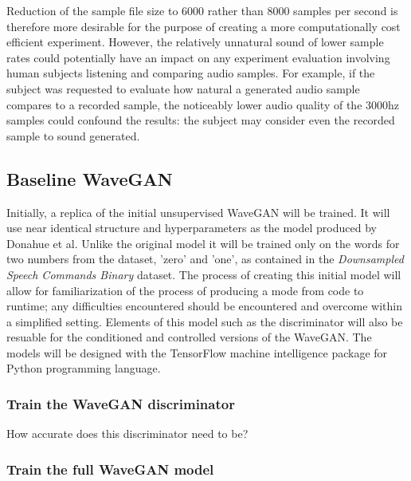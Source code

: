 \documentclass[titlepage]{article}
\begin{document}
\newline
\newline
Reduction of the sample file size to 6000 rather than 8000 samples per second is therefore more desirable for the purpose of creating a more computationally cost efficient experiment.
However, the relatively unnatural sound of lower sample rates could potentially have an impact on any experiment evaluation involving human subjects listening and comparing audio samples.
For example, if the subject was requested to evaluate how natural a generated audio sample compares to a recorded sample, the noticeably lower audio quality of the 3000hz samples could confound the results: the subject may consider even the recorded sample to sound generated.

\subsection{Baseline WaveGAN}

Initially, a replica of the initial unsupervised WaveGAN will be trained.
It will use near identical structure and hyperparameters as the model produced by Donahue et al.
Unlike the original model it will be trained only on the words for two numbers from the dataset, 'zero' and 'one', as contained in the \textit{Downsampled Speech Commands Binary} dataset.
\newline
\newline
The process of creating this initial model will allow for familiarization of the process of producing a mode from code to runtime; any difficulties encountered should be encountered and overcome within a simplified setting.
Elements of this model such as the discriminator will also be resuable for the conditioned and controlled versions of the WaveGAN.
\newline
\newline
The models will be designed with the TensorFlow machine intelligence package for Python programming language.

\subsubsection{Train the WaveGAN discriminator}

How accurate does this discriminator need to be?

\subsubsection{Train the full WaveGAN model}
\end{document}
